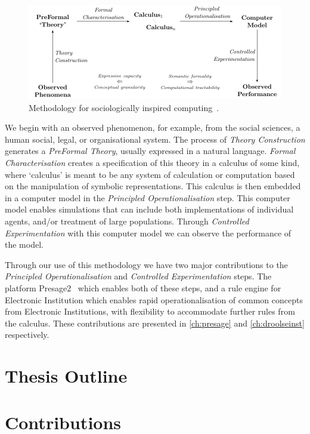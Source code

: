 \begin{figure}
\includegraphics[width=\linewidth]{gfx/sic}
\caption[Methodology for sociologically inspired computing.]{Methodology for sociologically inspired computing~\citep{Jones2013}.}\label{fig:sic}
\end{figure}

We begin with an observed phenomenon, for example, from the social sciences, a human social, legal, or organisational system. The process of \emph{Theory Construction} generates a \emph{PreFormal Theory}, usually expressed in a natural language. \emph{Formal Characterisation} creates a specification of this theory in a calculus of some kind, where `calculus' is meant to be any system of calculation or computation based on the manipulation of symbolic representations. This calculus is then embedded in a computer model in the \emph{Principled Operationalisation} step. This computer model enables simulations that can include both implementations of individual agents, and/or treatment of large populations. Through \emph{Controlled Experimentation} with this computer model we can observe the performance of the model.

Through our use of this methodology we have two major contributions to the \emph{Principled Operationalisation} and \emph{Controlled Experimentation} steps. The platform Presage2~\citep{Macbeth2014} which enables both of these steps, and a rule engine for Electronic Institution which enables rapid operationalisation of common concepts from Electronic Institutions, with flexibility to accommodate further rules from the calculus. These contributions are presented in \autoref{ch:presage} and \autoref{ch:droolseinst} respectively.

\section{Thesis Outline}

\section{Contributions}